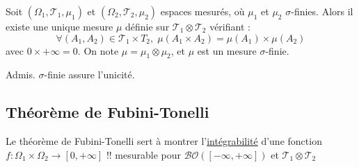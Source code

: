 \begin{Prop}{}{}
  Soit $(\Omega_1, \mathcal{T}_1, \mu_1)$ et $(\Omega_2, \mathcal{T}_2, \mu_2)$ espaces mesurés, où $\mu_1$ et $\mu_2$ $\sigma$-finies. Alors il existe une {\color{red} unique} mesure $\mu$ définie sur $\mathcal{T}_1 \otimes \mathcal{T}_2$ vérifiant : 
  \begin{equation}
    \forall (A_1, A_2) \in \mathcal{T}_1 \times T_2, \; \mu(A_1 \times A_2) = \mu(A_1) \times \mu (A_2)
  \end{equation}
  avec $0 \times + \infty = 0$. On note $\mu = \mu_1 \otimes \mu_2$, et $\mu$ est un mesure $\sigma$-finie.
\end{Prop}

\begin{myproof}{}{}
Admis. $\sigma$-finie assure l'unicité.
\end{myproof}


\subsection{Théorème de Fubini-Tonelli} %
\label{sub:Théorème de Fubini-Tonelli}

Le théorème de Fubini-Tonelli sert à montrer l'\underline{intégrabilité} d'une fonction $f : \Omega_1 \times \Omega_2 \to [0, +\infty]$ {\color{red} !!} mesurable pour $\mathcal{BO}([- \infty, +\infty])$ et $\mathcal{T}_1 \otimes \mathcal{T}_2$

